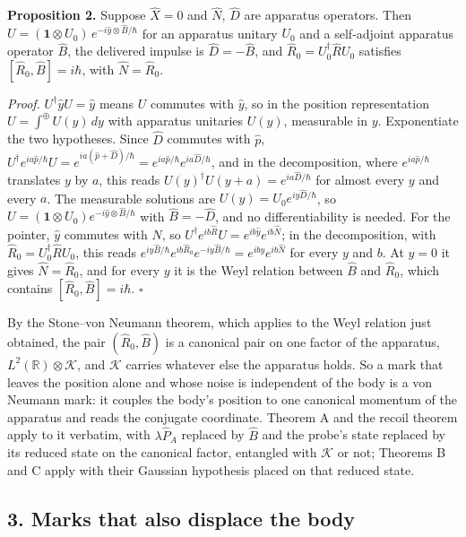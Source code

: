 \documentclass[11pt,a4paper]{article}
\begin{document}
\textbf{Proposition 2.} Suppose \(\hat X=0\) and \(\hat N\), \(\hat D\)
are apparatus operators. Then
\(U=(\mathbf 1\otimes U_0)\,e^{-i\hat y\otimes\hat B/\hbar}\) for an
apparatus unitary \(U_0\) and a self-adjoint apparatus operator
\(\hat B\), the delivered impulse is \(\hat D=-\hat B\), and
\(\hat R_0=U_0^\dagger\hat RU_0\) satisfies
\([\hat R_0,\hat B]=i\hbar\), with \(\hat N=\hat R_0\).

\emph{Proof.} \(U^\dagger\hat yU=\hat y\) means \(U\) commutes with
\(\hat y\), so in the position representation \(U=\int^\oplus U(y)\,dy\)
with apparatus unitaries \(U(y)\), measurable in \(y\). Exponentiate the
two hypotheses. Since \(\hat D\) commutes with \(\hat p\),
\(U^\dagger e^{ia\hat p/\hbar}U=e^{ia(\hat p+\hat D)/\hbar}=e^{ia\hat p/\hbar}e^{ia\hat D/\hbar}\),
and in the decomposition, where \(e^{ia\hat p/\hbar}\) translates \(y\)
by \(a\), this reads \(U(y)^\dagger U(y+a)=e^{ia\hat D/\hbar}\) for
almost every \(y\) and every \(a\). The measurable solutions are
\(U(y)=U_0e^{iy\hat D/\hbar}\), so
\(U=(\mathbf 1\otimes U_0)e^{-i\hat y\otimes\hat B/\hbar}\) with
\(\hat B=-\hat D\), and no differentiability is needed. For the pointer,
\(\hat y\) commutes with \(\hat N\), so
\(U^\dagger e^{ib\hat R}U=e^{ib\hat y}e^{ib\hat N}\); in the
decomposition, with \(\hat R_0=U_0^\dagger\hat RU_0\), this reads
\(e^{iy\hat B/\hbar}e^{ib\hat R_0}e^{-iy\hat B/\hbar}=e^{iby}e^{ib\hat N}\)
for every \(y\) and \(b\). At \(y=0\) it gives \(\hat N=\hat R_0\), and
for every \(y\) it is the Weyl relation between \(\hat B\) and
\(\hat R_0\), which contains \([\hat R_0,\hat B]=i\hbar\). \(\square\)

By the Stone--von Neumann theorem, which applies to the Weyl relation
just obtained, the pair \((\hat R_0,\hat B)\) is a canonical pair on one
factor of the apparatus, \(L^2(\mathbb R)\otimes\mathcal K\), and
\(\mathcal K\) carries whatever else the apparatus holds. So a mark that
leaves the position alone and whose noise is independent of the body is
a von Neumann mark: it couples the body's position to one canonical
momentum of the apparatus and reads the conjugate coordinate. Theorem A
and the recoil theorem apply to it verbatim, with \(\lambda\hat P_A\)
replaced by \(\hat B\) and the probe's state replaced by its reduced
state on the canonical factor, entangled with \(\mathcal K\) or not;
Theorems B and C apply with their Gaussian hypothesis placed on that
reduced state.

\hypertarget{marks-that-also-displace-the-body}{%
\subsection{3. Marks that also displace the
body}\label{marks-that-also-displace-the-body}}
\end{document}
